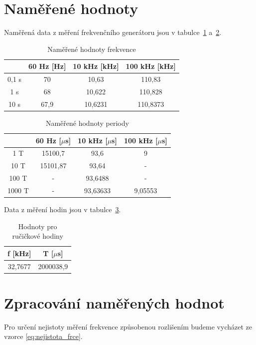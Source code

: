 \documentclass[a4paper,12pt]{article}   %
\newcommand{\tmu}{$\mu$}
\begin{document}
\section{Naměřené hodnoty}
Naměřená data z měření frekvenčního generátoru jsou v tabulce~\ref{tab:frce} a~\ref{tab:perioda}.

\begin{table}[h!]
  \centering
  \begin{tabular}{|c|c|c|c|}
      &60 Hz [Hz]&10 kHz [kHz]&100 kHz [kHz]\\\hline\hline
    0,1 s&70&10,63&110,83\\\hline
    1 s&68&10,622&110,828\\\hline
    10 s&67,9&10,6231&110,8373\\\hline
  \end{tabular}
  \label{tab:frce}
  \caption{Naměřené hodnoty frekvence}
\end{table}

\begin{table}[h!]
  \centering
  \begin{tabular}{|c|c|c|c|}
    &60 Hz [\tmu s]&10 kHz [\tmu s]&100 kHz [\tmu s]\\\hline\hline
    1 T&15100,7&93,6&9\\\hline
    10 T &15101,87&93,64&-\\\hline
    100 T&-&93,6488&-\\\hline
    1000 T&-&93,63633&9,05553\\\hline
  \end{tabular}
  \label{tab:perioda}
  \caption{Naměřené hodnoty periody}
\end{table}

Data z měření hodin jsou v tabulce~\ref{tab:hodiny}.

\begin{table}
  \begin{tabular}{|c|c|}
    f [kHz]&T [\tmu s]\\\hline\hline
    32,7677&2000038,9\\\hline
  \end{tabular}
  \caption{Hodnoty pro ručičkové hodiny}
  \label{tab:hodiny}
\end{table}




\section{Zpracování naměřených hodnot}
Pro určení nejistoty měření frekvence způsobenou rozlišením budeme vycházet ze vzorce \ref{eq:nejistota_frce}.
\end{document}
